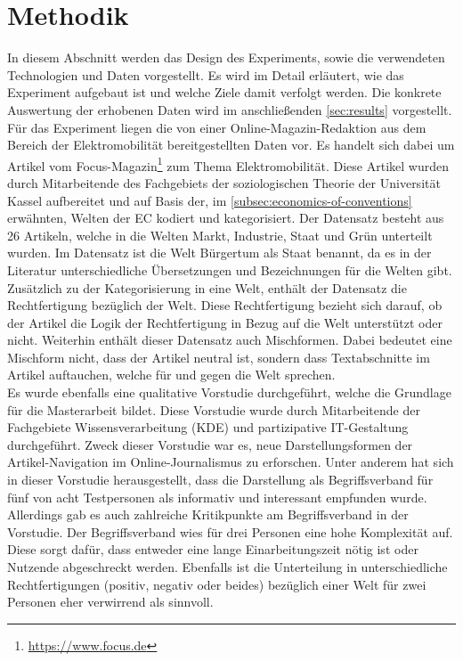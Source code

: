 \section{Methodik}\label{sec:method}
In diesem Abschnitt werden das Design des Experiments, sowie die verwendeten Technologien und Daten vorgestellt.
Es wird im Detail erläutert, wie das Experiment aufgebaut ist und welche Ziele damit verfolgt werden.
Die konkrete Auswertung der erhobenen Daten wird im anschließenden \autoref{sec:results} vorgestellt.\\

Für das Experiment liegen die von einer Online-Magazin-Redaktion aus dem Bereich der Elektromobilität bereitgestellten Daten vor.
Es handelt sich dabei um Artikel vom Focus-Magazin\footnote{\url{https://www.focus.de}} zum Thema Elektromobilität.
Diese Artikel wurden durch Mitarbeitende des Fachgebiets der soziologischen Theorie der Universität Kassel aufbereitet und auf Basis der, im \autoref{subsec:economics-of-conventions} erwähnten, Welten der \ac{EC} kodiert und kategorisiert.
Der Datensatz besteht aus 26 Artikeln, welche in die Welten Markt, Industrie, Staat und Grün unterteilt wurden.
Im Datensatz ist die Welt Bürgertum als Staat benannt, da es in der Literatur unterschiedliche Übersetzungen und Bezeichnungen für die Welten gibt.
Zusätzlich zu der Kategorisierung in eine Welt, enthält der Datensatz die Rechtfertigung bezüglich der Welt.
Diese Rechtfertigung bezieht sich darauf, ob der Artikel die Logik der Rechtfertigung in Bezug auf die Welt unterstützt oder nicht.
Weiterhin enthält dieser Datensatz auch Mischformen.
Dabei bedeutet eine Mischform nicht, dass der Artikel neutral ist, sondern dass Textabschnitte im Artikel auftauchen, welche für und gegen die Welt sprechen.\\

Es wurde ebenfalls eine qualitative Vorstudie durchgeführt, welche die Grundlage für die Masterarbeit bildet.
Diese Vorstudie wurde durch Mitarbeitende der Fachgebiete Wissensverarbeitung (KDE) und partizipative IT-Gestaltung durchgeführt.
Zweck dieser Vorstudie war es, neue Darstellungsformen der Artikel-Navigation im Online-Journalismus zu erforschen.
Unter anderem hat sich in dieser Vorstudie herausgestellt, dass die Darstellung als Begriffsverband für fünf von acht Testpersonen als informativ und interessant empfunden wurde.
Allerdings gab es auch zahlreiche Kritikpunkte am Begriffsverband in der Vorstudie.
Der Begriffsverband wies für drei Personen eine hohe Komplexität auf.
Diese sorgt dafür, dass entweder eine lange Einarbeitungszeit nötig ist oder Nutzende abgeschreckt werden.
Ebenfalls ist die Unterteilung in unterschiedliche Rechtfertigungen (positiv, negativ oder beides) bezüglich einer Welt für zwei Personen eher verwirrend als sinnvoll.

